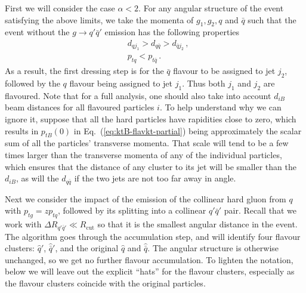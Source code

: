 \documentclass[nofootinbib,twocolumn,preprintnumbers,superscriptaddress,aps]{revtex4-2}
\begin{document}
First we will consider the case $\alpha < 2$.
%
For any angular structure of the event satisfying the above limits, we
take the momenta of $g_1, g_2, q$ and $\bar{q}$ such that the event
without the $g\to q'\bar q'$ emission has the following properties
\begin{subequations}
  \begin{align}
    \label{eq:GHS-4hard-initial-distances-alphaLT2}
%
    &d_{{q}j_1} > d_{{q}{\bar{q}}} > d_{{\bar{q}}j_2}\,, \\
    &p_{tq} < p_{t\bar{q}}\,. \label{eq:GHS-hard-pts}
%
  \end{align}
\end{subequations}
As a result, the first dressing step is for the $\bar q$ flavour to be
assigned to jet $j_2$, followed by the $q$ flavour being assigned to
jet $j_1$.
%
Thus both $j_1$ and $j_2$ are flavoured.
%
Note that for a full analysis, one should also take into account
$d_{iB}$ beam distances for all flavoured particles $i$.
%
To help understand why we can ignore it, suppose that all the hard
particles have rapidities close to zero, which results in $p_{tB}(0)$
in Eq.~(\ref{eq:ktB-flavkt-partial}) being approximately the scalar
sum of all the particles' transverse momenta.
%
That scale will tend to be a few times larger than the transverse
momenta of any of the individual particles, which ensures that the
distance of any cluster to its jet will be smaller than the $d_{iB}$,
as will the $d_{q\bar q}$ if the two jets are not too far away in
angle.


Next we consider the impact of the emission of the collinear hard gluon
from $q$ with $p_{tg} = z p_{tq}$, followed by its splitting into a
collinear $q'\bar q'$ pair.
%
Recall that we work with $\Delta R_{q'\bar q'} \ll R_{\text{cut}}$ so
that it is the smallest angular distance in the event.
%
The algorithm goes through the accumulation step, and will identify four flavour
clusters: $\hat q'$, $\hat{\bar q}'$, and the original $\hat q$ and $\hat{\bar q}$.
%
The angular structure is otherwise unchanged, so we
get no further flavour accumulation.
%
To lighten the notation, below we will leave out the explicit ``hats''
for the flavour clusters, especially as the flavour clusters coincide
with the original particles.
\end{document}
